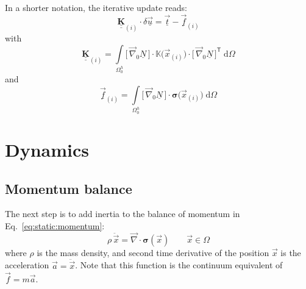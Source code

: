 \documentclass[times,namecite]{goose-article}
\begin{document}
In a shorter notation, the iterative update reads:
\begin{equation}
  \underline{\underline{\bm{K}}}_{(i)} \cdot \delta \underline{\vec{u}}
  =
  \underline{\vec{t}}
  -
  \underline{\vec{f}}_{(i)}
\end{equation}
with
\begin{equation}
  \underline{\underline{\bm{K}}}_{(i)}
  =
  \int\limits_{\Omega^h_0}
    \big[\, \vec{\nabla}_0 \underline{N} \,\big]
    \cdot
    \mathbb{K}\big(\vec{x}_{(i)}\big)
    \cdot
    \big[\, \vec{\nabla}_0 \underline{N} \,\big]^\mathsf{T} \;
  \mathrm{d}\Omega
\end{equation}
and
\begin{equation}
  \underline{\vec{f}}_{(i)}
  =
  \int\limits_{\Omega^h_0}
    \big[\, \vec{\nabla}_0 \underline{N} \,\big]
    \cdot
    \bm{\sigma}\big(\vec{x}_{(i)}\big) \;
  \mathrm{d}\Omega
\end{equation}

\section{Dynamics}

\subsection{Momentum balance}

The next step is to add inertia to the balance of momentum in Eq.~\eqref{eq:static:momentum}:
\begin{equation}
  \rho\, \ddot{\vec{x}}
  =
  \vec{\nabla} \cdot
  \bm{\sigma}(\vec{x})
  \qquad
  \vec{x} \in \Omega
\end{equation}
where $\rho$ is the mass density, and second time derivative of the position $\vec{x}$ is the acceleration $\vec{a} = \ddot{\vec{x}}$. Note that this function is the continuum equivalent of $\vec{f} = m \vec{a}$.
\end{document}
